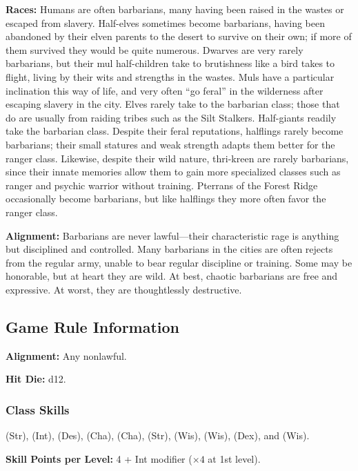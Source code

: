 \textbf{Races:} Humans are often barbarians, many having been raised in the wastes or escaped from slavery. Half-elves sometimes become barbarians, having been abandoned by their elven parents to the desert to survive on their own; if more of them survived they would be quite numerous. Dwarves are very rarely barbarians, but their mul half-children take to brutishness like a bird takes to flight, living by their wits and strengths in the wastes. Muls have a particular inclination this way of life, and very often ``go feral'' in the wilderness after escaping slavery in the city. Elves rarely take to the barbarian class; those that do are usually from raiding tribes such as the Silt Stalkers. Half-giants readily take the barbarian class. Despite their feral reputations, halflings rarely become barbarians; their small statures and weak strength adapts them better for the ranger class. Likewise, despite their wild nature, thri-kreen are rarely barbarians, since their innate memories allow them to gain more specialized classes such as ranger and psychic warrior without training. Pterrans of the Forest Ridge occasionally become barbarians, but like halflings they more often favor the ranger class.

\textbf{Alignment:} Barbarians are never lawful---their characteristic rage is anything but disciplined and controlled. Many barbarians in the cities are often rejects from the regular army, unable to bear regular discipline or training. Some may be honorable, but at heart they are wild. At best, chaotic barbarians are free and expressive. At worst, they are thoughtlessly destructive.

\subsection{Game Rule Information}
\textbf{Alignment:} Any nonlawful.

\textbf{Hit Die:} d12.

\subsubsection{Class Skills}
 (Str),  (Int),  (Des),  (Cha),  (Cha),  (Str),  (Wis),  (Wis),  (Dex), and  (Wis).

\textbf{Skill Points per Level:} 4 + Int modifier ($\times4$ at 1st level).


